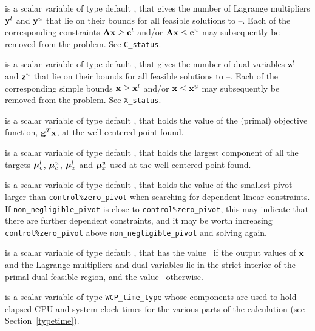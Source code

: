 \documentclass{galahad}
\newcommand{\packagename}{WCP}
\begin{document}
\begin{description}
 is a scalar variable of type default \integer, that gives the
number of Lagrange multipliers ${\mathbf{y}}^l$ and ${\mathbf{y}}^u$ that lie on their bounds 
for all feasible solutions to --. Each of the
corresponding constraints ${\mathbf{A}} {\mathbf{x}} \geq {\mathbf{c}}^l$ and/or 
${\mathbf{A}} {\mathbf{x}} \leq {\mathbf{c}}^u$ may subsequently be removed from the problem.
See {\tt C\_status}.

 is a scalar variable of type default \integer, that gives the
number of dual variables ${\mathbf{z}}^l$ and ${\mathbf{z}}^u$ that lie on their bounds 
for all feasible solutions to --. Each of the
corresponding simple bounds ${\mathbf{x}} \geq {\mathbf{x}}^l$ and/or 
${\mathbf{x}} \leq {\mathbf{x}}^u$ may subsequently be removed from the problem.
See {\tt X\_status}.

 is a scalar variable of type default \realdp, that holds the
value of the (primal) objective function, ${\mathbf{g}}^T {\mathbf{x}}$, 
at the well-centered point found.

 is a scalar variable of type default \realdp, 
that holds the largest component of all the targets
$\bm \mu_c^{l}$, $\bm \mu_c^{u}$, $\bm \mu_x^{l}$ and $\bm \mu_x^{u}$ used
at the well-centered point found.

 is a scalar variable of type default \realdp, 
that holds the value of the smallest pivot larger than 
{\tt control\%zero\_pivot}
when searching for dependent linear constraints. If 
{\tt non\_negligible\_pivot} is close to  {\tt control\%zero\_pivot},
this may indicate that there are further dependent constraints, and
it may be worth increasing {\tt control\%zero\_pivot} above 
{\tt non\_negligible\_pivot} and solving again.

 is a scalar variable of type default \logical, that has the
value \true\ if the output values of ${\mathbf{x}}$ and the Lagrange multipliers and
dual variables lie in the strict interior of the primal-dual feasible
region, and the value \false\ otherwise.

 is a scalar variable of type {\tt \packagename\_time\_type} 
whose components are used to hold elapsed CPU and system clock times for 
the various parts of the calculation (see Section~\ref{typetime}).


\end{description}
\end{document}
